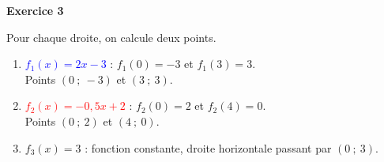 \documentclass[a4paper,11pt]{article}
\newenvironment{exercice}[1]{%
  \Needspace{6\baselineskip}\par\bigskip\noindent\textbf{Exercice #1}\par\smallskip\noindent\ignorespaces
}{%
  \par
}
\newcommand{\repere}[4]{%
  \draw[very thin, gray!40] (#1,#3) grid (#2,#4);
  \draw[->] (#1,0) -- ({#2+0.4},0) node[below right] {\small $x$};
  \draw[->] (0,#3) -- (0,{#4+0.4}) node[above left] {\small $y$};
  \foreach \x in {#1,...,#2} {\ifnum\x=0\else\draw (\x,0.08) -- (\x,-0.08) node[below] {\scriptsize $\x$};\fi}
  \foreach \y in {#3,...,#4} {\ifnum\y=0\else\draw (0.08,\y) -- (-0.08,\y) node[left] {\scriptsize $\y$};\fi}
  \node[below left] at (0,0) {\scriptsize $0$};
}
\begin{document}
\begin{exercice}{3}
\begin{minipage}[c]{0.5\linewidth}
Pour chaque droite, on calcule deux points.
\begin{enumerate}[label=\arabic*.]
\item \textcolor{blue}{$f_1(x)=2x-3$} : $f_1(0)=-3$ et $f_1(3)=3$.\\
Points $(0~;~-3)$ et $(3~;~3)$.
\item \textcolor{red}{$f_2(x)=-0{,}5x+2$} : $f_2(0)=2$ et $f_2(4)=0$.\\
Points $(0~;~2)$ et $(4~;~0)$.
\item \textcolor{green!50!black}{$f_3(x)=3$} : fonction constante, droite horizontale passant par $(0~;~3)$.
\end{enumerate}
\end{minipage}
\hfill
\begin{minipage}[c]{0.46\linewidth}
\centering
{}
\end{minipage}
\end{exercice}
\end{document}
